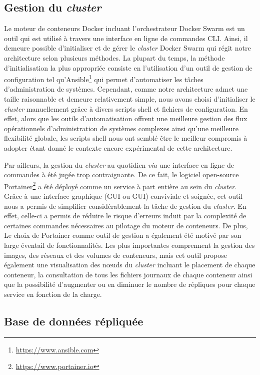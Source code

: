 \subsection{Gestion du \textit{cluster}}

Le moteur de conteneurs Docker incluant l'orchestrateur Docker Swarm est un outil qui est utilisé à travers une interface en ligne de commandes \acs{CLI}. Ainsi, il demeure possible d'initialiser et de gérer le \textit{cluster} Docker Swarm qui régit notre architecture selon plusieurs méthodes. La plupart du temps, la méthode d'initialisation la plus appropriée consiste en l'utilisation d'un outil de gestion de configuration tel qu'Ansible\footnote{\url{https://www.ansible.com}} qui permet d'automatiser les tâches d'administration de systèmes. Cependant, comme notre architecture admet une taille raisonnable et demeure relativement simple, nous avons choisi d'initialiser le \textit{cluster} manuellement grâce à divers scripts shell et fichiers de configuration. En effet, alors que les outils d'automatisation offrent une meilleure gestion des flux opérationnels d'administration de systèmes complexes ainsi qu'une meilleure flexibilité globale, les scripts shell nous ont semblé être le meilleur compromis à adopter étant donné le contexte encore expérimental de cette architecture.

Par ailleurs, la gestion du \textit{cluster} au quotidien \textit{via} une interface en ligne de commandes à été jugée trop contraignante. De ce fait, le logiciel open-source Portainer\footnote{\url{https://www.portainer.io}} a été déployé comme un service à part entière au sein du \textit{cluster}. Grâce à une interface graphique (\acl{GUI} ou \acs{GUI}) conviviale et soignée, cet outil nous a permis de simplifier considérablement la tâche de gestion du \textit{cluster}. En effet, celle-ci a permis de réduire le risque d'erreurs induit par la complexité de certaines commandes nécessaires au pilotage du moteur de conteneurs. De plus, Le choix de Portainer comme outil de gestion a également été motivé par son large éventail de fonctionnalités. Les plus importantes comprennent la gestion des images, des réseaux et des volumes de conteneurs, mais cet outil propose également une visualisation des n\oe{}uds du \textit{cluster} incluant le placement de chaque conteneur, la consultation de tous les fichiers journaux de chaque conteneur ainsi que la possibilité d'augmenter ou en diminuer le nombre de répliques pour chaque service en fonction de la charge.

\subsection{Base de données répliquée}


